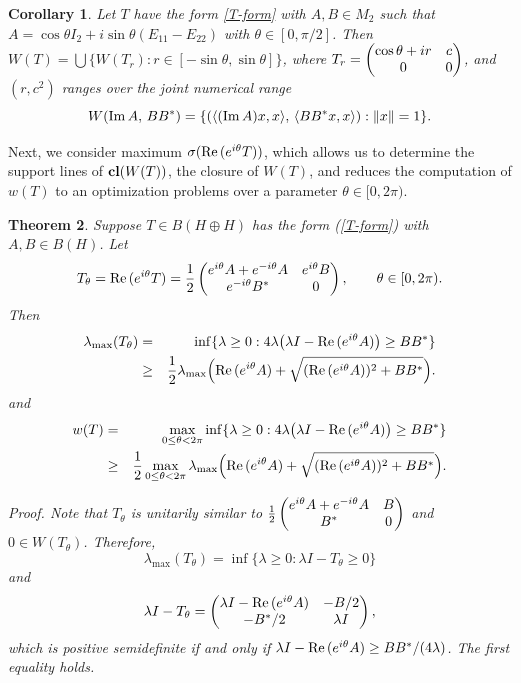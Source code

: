 \documentclass[11pt]{article}
\newtheorem{theorem}{Theorem}[section]
\newtheorem{corollary}[theorem]{Corollary}
\numberwithin{equation}{section}
\def\re{{\rm Re\,}}
\def\im{{\rm Im\,}}
\def\cl{{\bf cl}}
\begin{document}
\begin{corollary}
Let $T$ have the form \eqref{T-form} with $A, B \in M_2$ such that
$A = \cos\theta I_2 + i\sin \theta (E_{11}-E_{22})$ with $\theta \in [0,\pi/2]$.
Then $W(T) = \bigcup \{W(T_r): r \in [-\sin\theta , \sin\theta]\}$, where $T_r = \begin{pmatrix} \cos\theta + ir & c \cr 0 & 0 \cr
\end{pmatrix}$, and $(r, c^2)$ ranges over the joint numerical range
$$
W(\im A,\, BB^*) = \{ (\langle (\im A)x,x\rangle,\, \langle BB^* x,x\rangle ) : \|x\|=1 \}.
$$
\end{corollary}



Next, we consider maximum $\sigma(\re (e^{i\theta}T))$, which allows us
to determine  the support lines of $\cl(W(T))$, the closure of $W(T)$, and reduces
the computation of $w(T)$ to an optimization problems over a parameter $\theta \in [0, 2\pi)$.

\begin{theorem} \label{support-line}
Suppose $T\in B(H \oplus H)$ has the form {\rm (\ref{T-form})} with $A, B \in B(H)$.
Let
$$T_\theta = \re(e^{i\theta}T) = \frac{1}{2}
\begin{pmatrix} e^{i\theta} A + e^{-i\theta} A & e^{i\theta} B \cr
e^{-i\theta} B^* & 0 \cr\end{pmatrix}, \qquad \theta \in [0, 2\pi).$$
Then
\begin{eqnarray}\label{eq23}
 \lambda_{\max}(T_\theta) &=&
\inf \{ \lambda \ge 0: 4\lambda\big(\lambda I - \re (e^{i\theta} A)\big)
\ge BB^*\} \nonumber\\
& \ge &   \frac{1}{2} \lambda_{\max}\Big( \re(e^{i\theta}A) +
\sqrt{(\re(e^{i\theta}A))^2 + BB^*}\Big).
\end{eqnarray}
and
\begin{eqnarray*}w(T)&=&\max_{0\le \theta<2\pi}\inf \{ \lambda \ge 0: 4\lambda\big(\lambda I - \re (e^{i\theta} A)\big)
\ge BB^*\}\\
&\ge & \frac{1}{2} \max_{0\le \theta< 2\pi} \lambda_{\max}\Big( \re(e^{i\theta}A) +
\sqrt{(\re(e^{i\theta}A))^2 + BB^*}\Big).\end{eqnarray*}
\end{theorem}

\it Proof. \rm Note that $T_{\theta}$ is
unitarily similar to
$\frac{1}{2}
\begin{pmatrix} e^{i\theta} A + e^{-i\theta} A & B \cr
B^* & 0 \cr\end{pmatrix}$ and $0\in W(T_{\theta})$. Therefore,
$$\lambda_{\max}(T_\theta) = \inf\{\lambda\ge 0 : \lambda I - T_\theta \ge 0\}$$
and
$$\lambda I - T_\theta =  \begin{pmatrix} \lambda I - \re(e^{i\theta} A) & -B/2\cr
-B^*/2 & \lambda I\cr\end{pmatrix},$$
which is positive semidefinite if and only if
$\lambda I - \re(e^{i\theta} A) \ge BB^*/(4\lambda)$. The first equality holds.
\end{document}
